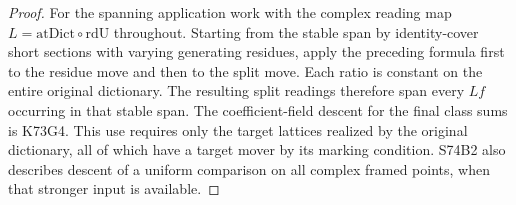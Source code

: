 \begin{proof}
For the spanning application work with the complex reading map
$L=\mathrm{atDict}\circ\mathrm{rdU}$ throughout. Starting from
the stable span by identity-cover short sections with varying
generating residues, apply the preceding formula first to the
residue move and then to the split move. Each ratio is constant
on the entire original dictionary. The resulting split readings
therefore span every $Lf$ occurring in that stable span.
The coefficient-field descent for the final class sums is K73G4.
This use requires only the target lattices realized by the original
dictionary, all of which have a target mover by its marking
condition. S74B2 also describes descent of a uniform comparison on
all complex framed points, when that stronger input is available.
\end{proof}
